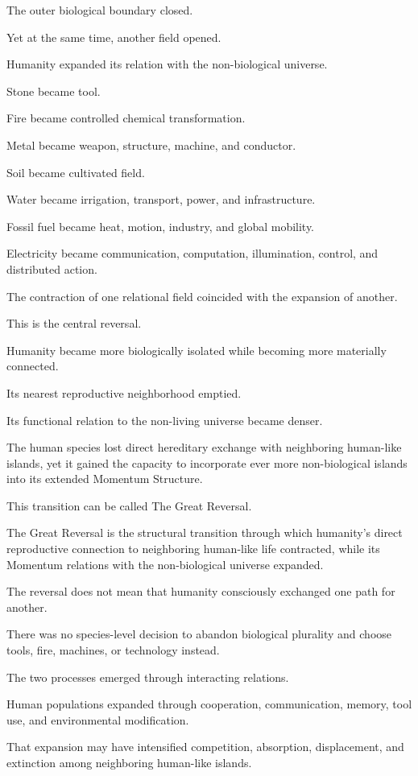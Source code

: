 The outer biological boundary closed.

Yet at the same time, another field opened.

Humanity expanded its relation with the non-biological universe.

Stone became tool.

Fire became controlled chemical transformation.

Metal became weapon, structure, machine, and conductor.

Soil became cultivated field.

Water became irrigation, transport, power, and infrastructure.

Fossil fuel became heat, motion, industry, and global mobility.

Electricity became communication, computation, illumination, control, and distributed action.

The contraction of one relational field coincided with the expansion of another.

This is the central reversal.

Humanity became more biologically isolated while becoming more materially connected.

Its nearest reproductive neighborhood emptied.

Its functional relation to the non-living universe became denser.

The human species lost direct hereditary exchange with neighboring human-like islands, yet it gained the capacity to incorporate ever more non-biological islands into its extended Momentum Structure.

This transition can be called The Great Reversal.

The Great Reversal is the structural transition through which humanity’s direct reproductive connection to neighboring human-like life contracted, while its Momentum relations with the non-biological universe expanded.

The reversal does not mean that humanity consciously exchanged one path for another.

There was no species-level decision to abandon biological plurality and choose tools, fire, machines, or technology instead.

The two processes emerged through interacting relations.

Human populations expanded through cooperation, communication, memory, tool use, and environmental modification.

That expansion may have intensified competition, absorption, displacement, and extinction among neighboring human-like islands.

